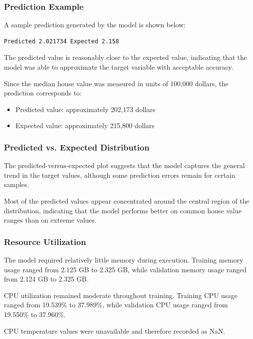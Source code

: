 \documentclass[10pt,a4paper,twocolumn]{article}
\begin{document}
\subsubsection{Prediction Example}

A sample prediction generated by the model is shown below:

\begin{verbatim}
Predicted 2.021734 Expected 2.158
\end{verbatim}

The predicted value is reasonably close to the expected value, indicating that the model was able to approximate the target variable with acceptable accuracy.

Since the median house value was measured in units of 100,000 dollars, the prediction corresponds to:

\begin{itemize}
    \item Predicted value: approximately 202,173 dollars
    \item Expected value: approximately 215,800 dollars
\end{itemize}

\subsubsection{Predicted vs. Expected Distribution}

The predicted-versus-expected plot suggests that the model captures the general trend in the target values, although some prediction errors remain for certain samples.

Most of the predicted values appear concentrated around the central region of the distribution, indicating that the model performs better on common house value ranges than on extreme values.

\subsubsection{Resource Utilization}

The model required relatively little memory during execution. Training memory usage ranged from 2.125 GB to 2.325 GB, while validation memory usage ranged from 2.124 GB to 2.325 GB.

CPU utilization remained moderate throughout training. Training CPU usage ranged from 19.539\% to 37.989\%, while validation CPU usage ranged from 19.550\% to 37.960\%.

CPU temperature values were unavailable and therefore recorded as NaN.
\end{document}
